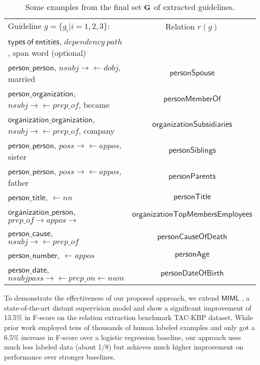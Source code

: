 \documentclass[11pt]{article}
\begin{document}
\captionsetup{belowskip=-12pt,aboveskip=4pt}
\setlength{\intextsep}{10pt}
\setlength{\textfloatsep}{0pt}
\begin{table*}[ht]
\begin{tabular}{| l |c | }
\hline Guideline $g=\{g_i| i=1, 2, 3\}$: 						&  Relation $r(g)$       \\
  $\mathsf{types\ of\ entities}$, $dependency\ path$, span word (optional)    	&   \\
 \hline
 $\mathsf{person\_person}$,    $nsubj \rightarrow\leftarrow dobj$, married   			 &   $\mathsf{personSpouse}$ \\
$\mathsf{person\_organization}$,    $nsubj \rightarrow\leftarrow prep\_of$, became     	 &   $\mathsf{personMemberOf}$ \\
$\mathsf{organization\_organization}$,   $nsubj \rightarrow\leftarrow prep\_of$, company    	 &    $\mathsf{organizationSubsidiaries}$ \\
$\mathsf{person\_person}$,    $poss \rightarrow\leftarrow appos$, sister				&   $\mathsf{personSiblings}$\\
$\mathsf{person\_person}$,    $poss \rightarrow\leftarrow appos$, father				&   $\mathsf{personParents}$ \\
$\mathsf{person\_title}$,    $\leftarrow nn$   									&   $\mathsf{personTitle}$ \\
$\mathsf{organization\_person}$,    $prep\_of\rightarrow appos\rightarrow$     	&   $\mathsf{organizationTopMembersEmployees}$ \\
$\mathsf{person\_cause}$,    $nsubj \rightarrow\leftarrow prep\_of$     				&   $\mathsf{personCauseOfDeath}$ \\
$\mathsf{person\_number}$,    $\leftarrow appos$     							&   $\mathsf{personAge}$ \\
$\mathsf{person\_date}$,    $nsubjpass \rightarrow\leftarrow prep\_on\leftarrow num$    	 &  $\mathsf{personDateOfBirth}$ \\

\hline
\end{tabular}
\caption{\label{font-table} Some examples from the final set  ${\bf G}$ of extracted guidelines.}
\label{set}
\end{table*}

To demonstrate the effectiveness of our proposed approach, we extend $\mathsf{MIML}$ \cite{surdeanu12}, a state-of-the-art distant supervision model 
and show a significant improvement of 13.5\% in F-score on the relation extraction benchmark TAC-KBP \cite{ji11} dataset. While prior work employed tens 
of thousands of human labeled examples \cite{zhang2012big} and only got a 6.5\% increase in F-score over a logistic regression baseline, our approach 
uses much less labeled data (about 1/8) but achieves much higher improvement on performance over stronger baselines.
\end{document}
